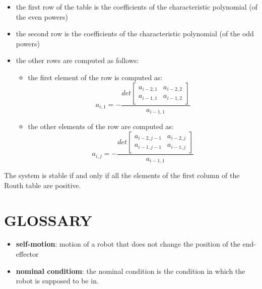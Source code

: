 \documentclass[a4paper,12pt]{article}
\begin{document}
        \begin{itemize}
            \item the first row of the table is the coefficients of the 
            characteristic polynomial (of the even powers)
            \item the second row is the coefficients of the characteristic
            polynomial (of the odd powers)
            \item the other rows are computed as follows:
            \begin{itemize}
                \item the first element of the row is computed as:
                \begin{equation}
                    a_{i,1} = -\frac{det\begin{bmatrix}
                        a_{i-2,1} & a_{i-2,2}\\
                        a_{i-1,1} & a_{i-1,2}
                    \end{bmatrix}}{a_{i-1,1}}
                \end{equation}
                \item the other elements of the row are computed as:
                \begin{equation}
                    a_{i,j} = -\frac{det\begin{bmatrix}
                        a_{i-2,j-1} & a_{i-2,j}\\
                        a_{i-1,j-1} & a_{i-1,j}
                    \end{bmatrix}}{a_{i-1,1}}
                \end{equation}
            \end{itemize}
        \end{itemize}
        The system is stable if and only if all the elements
         of the first column
        of the Routh table are positive.
\section{GLOSSARY}
\begin{itemize}
\item \textbf{self-motion}:  motion of a robot that does 
not change the position of the end-effector
\label{glossary:self-motion}
\item \textbf{nominal conditiom}: the nominal condition is the condition 
in which the robot is supposed to be in.
\label{glossary:nominal condition}
\end{itemize}
\end{document}
